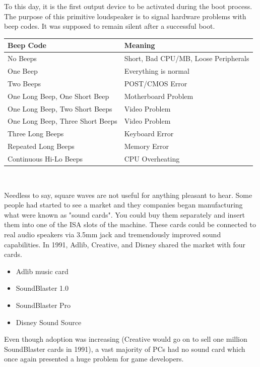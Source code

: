 \documentclass[book.tex]{subfiles}
\begin{document}
\par
 To this day, it is the first output device to be activated during the boot process. The purpose of this primitive loudspeaker is to signal hardware problems with beep codes. It was supposed to remain silent after a successful boot.\\
\par
\begin{tabularx}{\textwidth}{l l}
\textbf{Beep Code} & \textbf{Meaning}  \\ \hline
No Beeps                         & Short, Bad CPU/MB, Loose Peripherals \\ \hline
One Beep                         & Everything is normal\\ \hline
Two Beeps                        & POST/CMOS Error \\ \hline 
One Long Beep, One Short Beep    & Motherboard Problem \\ \hline
One Long Beep, Two Short Beeps   & Video Problem \\ \hline
One Long Beep, Three Short Beeps & Video Problem \\ \hline
Three Long Beeps                 & Keyboard Error \\ \hline
Repeated Long Beeps              & Memory Error \\ \hline
Continuous Hi-Lo Beeps           & CPU Overheating \\ \hline
\end{tabularx}\\
\bigskip
\par
Needless to say, square waves are not useful for anything pleasant to hear. Some people had started to see a market and they companies began manufacturing what were known as "sound cards". You could buy them separately and insert them into one of the ISA slots of the machine. These cards could be connected to real audio speakers via 3.5mm jack and tremendously improved sound capabilities. In 1991, Adlib, Creative, and Disney shared the market with four cards.\\
\par
\begin{itemize}
\item Adlib music card
\item SoundBlaster 1.0
\item SoundBlaster Pro
\item Disney Sound Source
\end{itemize}
\par
Even though adoption was increasing (Creative would go on to sell one million SoundBlaster cards in 1991), a vast majority of PCs had no sound card which once again presented a huge problem for game developers.
\end{document}

